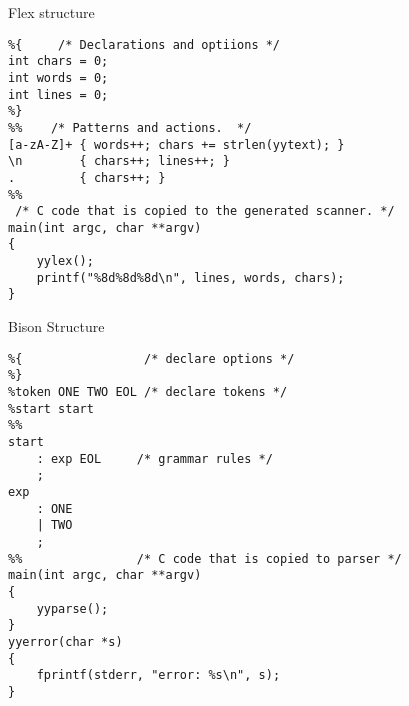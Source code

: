 \documentclass[compress]{beamer}
\begin{document}


\begin{frame}[containsverbatim]{Flex structure}
\scriptsize{\begin{verbatim}
%{     /* Declarations and optiions */
int chars = 0;
int words = 0;
int lines = 0;
%}
%%    /* Patterns and actions.  */
[a-zA-Z]+ { words++; chars += strlen(yytext); }
\n        { chars++; lines++; }
.         { chars++; }
%%
 /* C code that is copied to the generated scanner. */
main(int argc, char **argv)
{
    yylex();
    printf("%8d%8d%8d\n", lines, words, chars);
}
\end{verbatim}}
\end{frame}


\begin{frame}[containsverbatim]{Bison Structure}
\scriptsize{\begin{verbatim}
%{                 /* declare options */
%}                  
%token ONE TWO EOL /* declare tokens */
%start start
%%               
start
    : exp EOL     /* grammar rules */
    ;
exp
    : ONE 
    | TWO
    ;
%%                /* C code that is copied to parser */
main(int argc, char **argv)
{
    yyparse();
}
yyerror(char *s)
{
    fprintf(stderr, "error: %s\n", s);
}
\end{verbatim}}
\end{frame}
\end{document}
